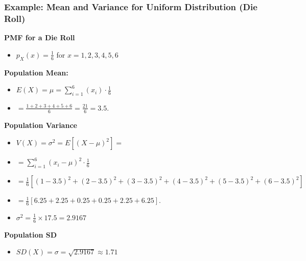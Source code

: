 \documentclass[handout]{beamer} %
\begin{document}
\begin{frame} %
\frametitle{Example: Mean and Variance for Uniform Distribution (Die Roll)}

\begin{minipage}{0.45\textwidth}
\textbf{PMF for a Die Roll}
\begin{itemize}
    \item $p_X(x) = \frac{1}{6}$ for $x = 1, 2, 3, 4, 5, 6$
\end{itemize}
  \pause
\textbf{Population Mean:}
\begin{itemize}
    \pause
    \item  $E(X) = \mu = \sum_{i=1}^{6} (x_i) \cdot \frac{1}{6}$
    \pause
    \item[{}] $=\frac{1 + 2 + 3 + 4 + 5 + 6}{6} = \frac{21}{6} = 3.5.$
\end{itemize}
\end{minipage}
\hfill
\begin{minipage}{0.45\textwidth}
\textbf{Population Variance}
  \pause
\begin{itemize}
    \item $V(X) = \sigma^2 = E[(X-\mu)^2] =$
    \pause
    \item[{}] $ =\sum_{i=1}^{6} (x_i - \mu)^2 \cdot \frac{1}{6}$
    \pause
    \item[{}] $= \frac{1}{6} [(1-3.5)^2 + (2-3.5)^2 + (3-3.5)^2 + (4-3.5)^2 + (5-3.5)^2 + (6-3.5)^2]$
    \pause
    \item[{}] $= \frac{1}{6} [6.25 + 2.25 + 0.25 + 0.25 + 2.25 + 6.25].$
    \pause
    \item $\sigma^2 = \frac{1}{6} \times 17.5 = 2.9167$
\end{itemize}
  \pause
\textbf{Population SD}
\begin{itemize}
    \pause
    \item $SD(X) = \sigma = \sqrt{2.9167} \approx 1.71$
\end{itemize}
\end{minipage}

\end{frame}
\end{document}
